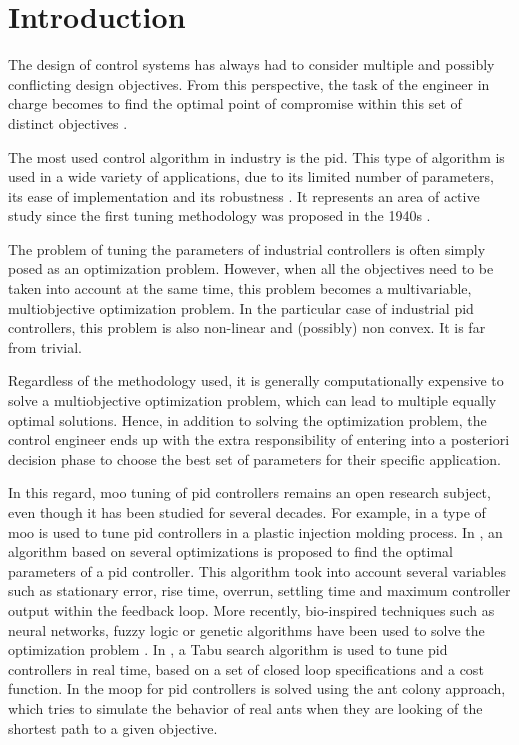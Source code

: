 \chapter{Introduction}
\label{sec:Antecedentes}
The design of control systems has always had to consider multiple and possibly conflicting design objectives. From this perspective, the task of the engineer in charge becomes to find the optimal point of compromise within this set of distinct objectives \citep{Garpinger2012}.

The most used control algorithm in industry is the \gls{pid}. This type of algorithm is used in a wide variety of applications, due to its limited number of parameters, its ease of implementation and its robustness \citep{astromhagglund2006}. It represents an area of active study since the first tuning methodology was proposed in the 1940s \citep{Ziegler1942}.

The problem of tuning the parameters of industrial controllers is often simply posed as an optimization problem. However, when all the objectives need to be taken into account at the same time, this problem becomes a multivariable, multiobjective optimization problem. In the particular case of industrial \gls{pid} controllers, this problem is also non-linear and (possibly) non convex. It is far from trivial.

Regardless of the methodology used, it is generally computationally expensive to solve a multiobjective optimization problem, which can lead to multiple equally optimal solutions. Hence, in addition to solving the optimization problem, the control engineer ends up with the extra responsibility of entering into a posteriori decision phase to choose the best set of parameters for their specific application.

In this regard, \gls{moo} tuning of \gls{pid} controllers remains an open research subject, even though it has been studied for several decades. For example, in \citet{Seaman1994} a type of \gls{moo} is used to tune \gls{pid} controllers in a plastic injection molding process. In \citet{Abbas1995}, an algorithm based on several optimizations is proposed to find the optimal parameters of a \gls{pid} controller. This algorithm took into account several variables such as stationary error, rise time, overrun, settling time and maximum controller output within the feedback loop. More recently, bio-inspired techniques such as neural networks, fuzzy logic or genetic algorithms have been used to solve the optimization problem \citet{Reynoso-Meza2012b}. In \citet{Bagis2011}, a Tabu search algorithm is used to tune \gls{pid} controllers in real time, based on a set of closed loop specifications and a cost function. In \citet{Chiha2012} the \gls{moop} for \gls{pid} controllers is solved using the ant colony approach, which tries to simulate the behavior of real ants when they are looking of the shortest path to a given objective.

